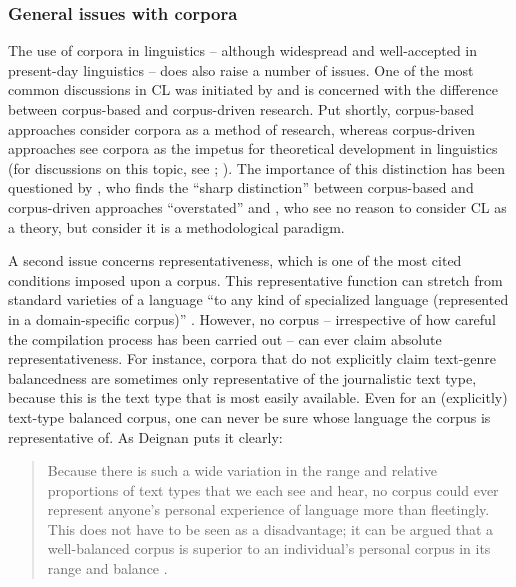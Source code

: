 \subsubsection{General issues with corpora}
\label{sec:2.2.1.4}  
The use of corpora in linguistics – although widespread and well-accepted in present-day linguistics – does also raise a number of issues. One of the most common discussions in CL was initiated by \citet{tognini-bonelli_corpus_2001} and is concerned with the difference between corpus-based and corpus-driven research. Put shortly, corpus-based approaches consider corpora as a method of research, whereas corpus-driven approaches see corpora as the impetus for theoretical development in linguistics (for discussions on this topic, see \citet[384-385]{hardie_two_2010}; \citet[150 ff.]{mcenery_corpus_2012}). The importance of this distinction has been questioned by \citet[994]{ludeling_theory-driven_2009}, who finds the “sharp distinction” between corpus-based and corpus-driven approaches “overstated” and \citet[328]{gries_behavioral_2010}, who see no reason to consider CL as a theory, but consider it is a methodological paradigm.

A second issue concerns representativeness, which is one of the most cited conditions imposed upon a corpus. This representative function can stretch from standard varieties of a language “to any kind of specialized language (represented in a domain-specific corpus)” \citep[11]{aijmer_state_1991}. However, no corpus – irrespective of how careful the compilation process has been carried out – can ever claim absolute representativeness. For instance, corpora that do not explicitly claim text-genre balancedness are sometimes only representative of the journalistic text type, because this is the text type that is most easily available. Even for an (explicitly) text-type balanced corpus, one can never be sure whose language the corpus is representative of. As Deignan puts it clearly:

\begin{quote}
Because there is such a wide variation in the range and relative proportions of text types that we each see and hear, no corpus could ever represent anyone’s personal experience of language more than fleetingly. This does not have to be seen as a disadvantage; it can be argued that a well-balanced corpus is superior to an individual’s personal corpus in its range and balance \citep[91]{deignan_metaphor_2005}.
\end{quote}

